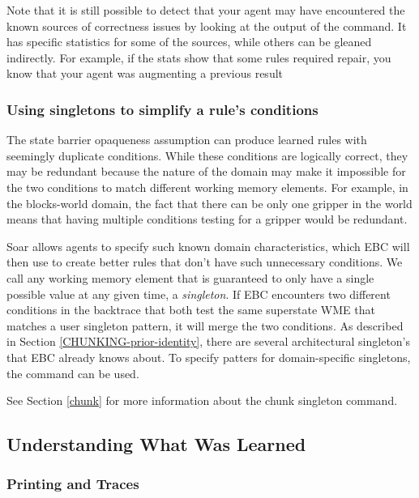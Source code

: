 \begin{itemize}
Note that it is still possible to detect that your agent may have encountered the known sources of correctness issues by looking at the output of the  command.  It has specific statistics for some of the sources, while others can be gleaned indirectly.  For example, if the stats show that some rules required repair, you know that your agent was augmenting a previous result

\subsubsection{Using singletons to simplify a rule's conditions}
\label{CHUNKING-usage-tuning-conditions}

The state barrier opaqueness assumption can produce learned rules with seemingly duplicate conditions.  While these conditions are logically correct, they may be redundant because the nature of the domain may make it impossible for the two conditions to match different working memory elements.  For example, in the blocks-world domain, the fact that there can be only one gripper in the world means that having multiple conditions testing for a gripper would be redundant.  

Soar allows agents to specify such known domain characteristics, which EBC will then use to create better rules that don't have such unnecessary conditions.  We call any working memory element that is guaranteed to only have a single possible value at any given time, a \textit{singleton}.  If EBC encounters two different conditions in the backtrace that both test the same superstate WME that matches a user singleton pattern, it will merge the two conditions. As described in Section \ref{CHUNKING-prior-identity}, there are several architectural singleton's that EBC already knows about.  To specify patters for domain-specific singletons, the  command can be used. 

See Section \ref{chunk} for more information about the chunk singleton command.

\subsection{Understanding What Was Learned}

\subsubsection{Printing and Traces}


\end{itemize}
